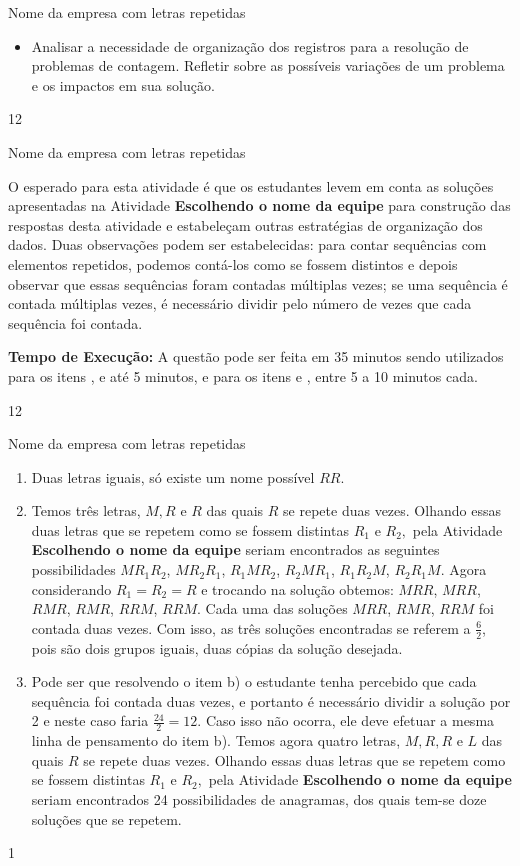\begin{objectives}{Nome da empresa com letras repetidas}
{
\begin{itemize}
\item Analisar a necessidade de organização dos registros para a resolução de problemas de contagem. Refletir sobre as possíveis variações de um problema e os impactos em sua solução. 
\end{itemize}
}{1}{2}
\end{objectives}
\mspace{-2.25em}
\begin{sugestions}{Nome da empresa com letras repetidas}
{
O esperado para esta atividade é que os estudantes levem em conta as soluções apresentadas na Atividade \textbf{Escolhendo o nome da equipe} para construção das respostas desta atividade e estabeleçam outras estratégias de organização dos dados. Duas observações podem ser estabelecidas: para contar sequências com elementos repetidos, podemos contá-los como se fossem distintos e depois observar que essas sequências foram contadas múltiplas vezes; se uma sequência é contada múltiplas vezes, é necessário dividir pelo número de vezes que cada sequência foi contada.

\textbf{Tempo de Execução:} A questão pode ser feita em 35 minutos sendo utilizados para os itens ,  e  até 5  minutos, e para os itens  e , entre 5 a 10 minutos cada.
}{1}{2}
\end{sugestions}
\mspace{-1.25em}
\begin{answer}{Nome da empresa com letras repetidas}
{
\begin{enumerate}
\item Duas letras iguais, só existe um nome possível $RR$.
\item Temos três letras, $M,R$ e $R$ das quais $R$ se repete duas vezes. Olhando essas duas letras que se repetem como se fossem distintas $R_{1}$ e $R_{2},$ pela Atividade \textbf{Escolhendo o nome da equipe} seriam encontrados as seguintes possibilidades 
$MR_{1}R_{2}$, $MR_{2}R_{1}$, $R_{1}MR_{2}$, $R_{2}MR_{1}$, $R_{1}R_{2}M$, $R_{2}R_{1}M.$
Agora considerando $R_{1}=R_{2}=R$ e trocando na solução obtemos:
$MRR$, $MRR$, $RMR$, $RMR$, $RRM$, $RRM$. Cada uma das soluções $MRR$, $RMR$, $RRM$ foi contada duas vezes. Com isso, as três soluções encontradas se referem a $\frac{6}{2}$, pois são dois grupos iguais, duas cópias da solução desejada.
\item Pode ser que resolvendo o item b) o estudante tenha percebido que cada sequência foi contada duas vezes, e portanto é necessário dividir a solução por 2 e neste caso faria $\frac{24}{2}=12$. Caso isso não ocorra, ele deve efetuar a mesma linha de pensamento do item b). Temos agora quatro letras, $M,R,R$ e $L$ das quais $R$ se repete duas vezes. Olhando essas duas letras que se repetem como se fossem distintas $R_{1}$ e $R_{2},$ pela Atividade \textbf{Escolhendo o nome da equipe} seriam encontrados  24 possibilidades de anagramas, dos quais tem-se doze soluções que se repetem. 
\end{enumerate}
}{1}
\end{answer}

